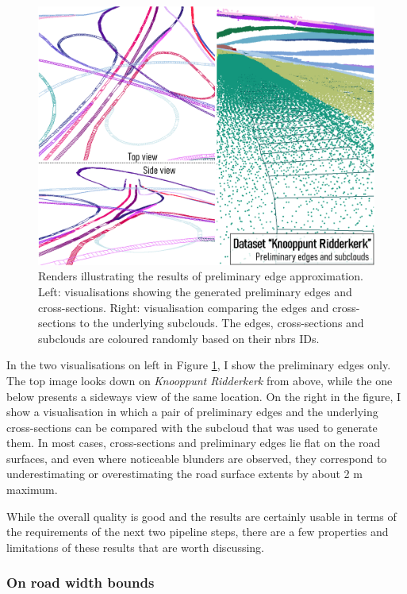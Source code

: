\begin{figure}
    \centering
    \includegraphics[width=0.9\linewidth]{final_report/figs/edgeapproximation0.png}
    \caption[Renders illustrating the results of preliminary edge approximation]{Renders illustrating the results of preliminary edge approximation. Left: visualisations showing the generated preliminary edges and cross-sections. Right: visualisation comparing the edges and cross-sections to the underlying subclouds. The edges, cross-sections and subclouds are coloured randomly based on their \ac{nbrs} IDs.}
    \label{fig:edgeapproximation0}
\end{figure}

In the two visualisations on left in Figure \ref{fig:edgeapproximation0}, I show the preliminary edges only. The top image looks down on \textit{Knooppunt Ridderkerk} from above, while the one below presents a sideways view of the same location. On the right in the figure, I show a visualisation in which a pair of preliminary edges and the underlying cross-sections can be compared with the subcloud that was used to generate them. In most cases, cross-sections and preliminary edges lie flat on the road surfaces, and even where noticeable blunders are observed, they correspond to underestimating or overestimating the road surface extents by about 2 m maximum.

While the overall quality is good and the results are certainly usable in terms of the requirements of the next two pipeline steps, there are a few properties and limitations of these results that are worth discussing.

\subsubsection{On road width bounds}

